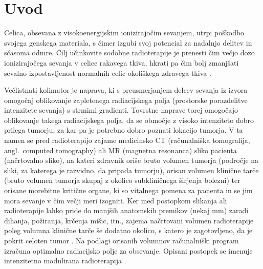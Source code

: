 \documentclass[journal]{IEEEtran}
\begin{document}
\section{Uvod}

Celica, obsevana z visokoenergijskim ionizirajočim sevanjem, utrpi poškodbo svojega genskega materiala, s čimer izgubi svoj potencial za nadalnjo delitev in sčasoma odmre. Cilj učinkovite sodobne radioterapije je prenesti čim večjo dozo ionizirajočega sevanja v celice rakavega tkiva, hkrati pa čim bolj zmanjšati sevalno izpostavljenost normalnih celic okoliškega zdravega tkiva \cite{baskar2012}.

Večlistnati kolimator je naprava, ki s preusmerjanjem delcev sevanja iz izvora omogočaj oblikovanje zapletenega radiacijskega polja (prostorske porazdelitve intenzitete sevanja) s strmimi gradienti. Tovrstne naprave torej omogočajo oblikovanje takega radiacijskega polja, da se območje z visoko intenziteto dobro prilega tumorju, za kar pa je potrebno dobro poznati lokacijo tumorja. V ta namen se pred radioterapijo zajame medicinsko CT (računalniška tomografija, angl.~computed tomography) ali MR (magnetna resonanca) sliko pacienta (načrtovalno sliko), na kateri zdravnik oriše bruto volumen tumorja (področje na sliki, za katerega je razvidno, da pripada tumorju), orisan volumen klinične tarče (bruto volumen tumorja skupaj z okolico subkliničnega širjenja bolezni) ter orisane morebitne kritične organe, ki so vitalnega pomena za pacienta in se jim mora sevanje v čim večji meri izogniti. Ker med postopkom slikanja ali radioterapije lahko pride do manjših anatomskih premikov (nekaj mm) zaradi dihanja, požiranja, krčenja mišic, itn., zajema načrtovani volumen radioterapije poleg volumna klinične tarče še dodatno okolico, s katero je zagotovljeno, da je pokrit celoten tumor \cite{burnet2004}. Na podlagi orisanih volumnov računalniški program izračuna optimalno radiacijsko polje za obsevanje. Opisani postopek se imenuje intenzitetno modulirana radioterapija \cite{jaffray2012}.
\end{document}
